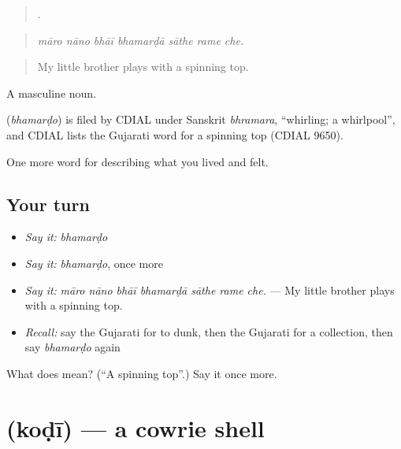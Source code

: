 \begin{quote}
      .
\end{quote}

\begin{quote}
\emph{māro nāno bhāī bhamarḍā sāthe rame che.}
\end{quote}

\begin{quote}
My little brother plays with a spinning top.
\end{quote}

A masculine noun.

\begin{cousinweb}
\textbf{} (\emph{bhamarḍo}) is filed by CDIAL under Sanskrit \emph{bhramara}, \textquotedblleft{}whirling; a whirlpool\textquotedblright{}, and CDIAL lists the Gujarati word for a spinning top (CDIAL 9650).
\end{cousinweb}

\begin{grammarlens}[title={What you've built}]
One more word for describing what you lived and felt.
\end{grammarlens}

\subsection*{Your turn}
\begin{itemize}
\raggedright
  \item \emph{Say it:} \emph{bhamarḍo}
  \item \emph{Say it:} \emph{bhamarḍo}, once more
  \item \emph{Say it:} \emph{māro nāno bhāī bhamarḍā sāthe rame che.} — My little brother plays with a spinning top.
  \item \emph{Recall:} say the Gujarati for to dunk, then the Gujarati for a collection, then say \emph{bhamarḍo} again
\end{itemize}

\begin{tcolorbox}[breakable,colback=teal!4,colframe=teal!35!black,title={Before you move on}]
What does  mean? (\textquotedblleft{}A spinning top\textquotedblright{}.) Say it once more.
\end{tcolorbox}
\section[\texorpdfstring{\gu{કોડી} (koḍī)}{કોડી (koḍī)}]{ (koḍī) — a cowrie shell}


